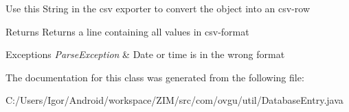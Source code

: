 Use this String in the csv exporter to convert the object into an csv-\/row \begin{DoxyReturn}{Returns}
Returns a line containing all values in csv-\/format 
\end{DoxyReturn}

\begin{DoxyExceptions}{Exceptions}
{\em Parse\-Exception} & Date or time is in the wrong format \\
\hline
\end{DoxyExceptions}


The documentation for this class was generated from the following file\-:\begin{DoxyCompactItemize}
\item 
C\-:/\-Users/\-Igor/\-Android/workspace/\-Z\-I\-M/src/com/ovgu/util/Database\-Entry.\-java\end{DoxyCompactItemize}
